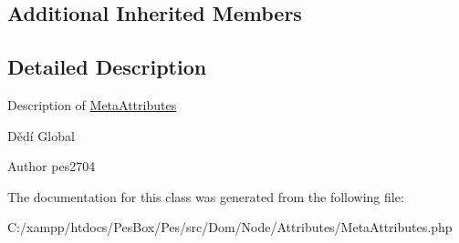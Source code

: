 \subsection*{Additional Inherited Members}


\subsection{Detailed Description}
Description of \mbox{\hyperlink{class_pes_1_1_dom_1_1_node_1_1_attributes_1_1_meta_attributes}{Meta\+Attributes}}

Dědí Global

\begin{DoxyAuthor}{Author}
pes2704 
\end{DoxyAuthor}


The documentation for this class was generated from the following file\+:\begin{DoxyCompactItemize}
\item 
C\+:/xampp/htdocs/\+Pes\+Box/\+Pes/src/\+Dom/\+Node/\+Attributes/Meta\+Attributes.\+php\end{DoxyCompactItemize}
